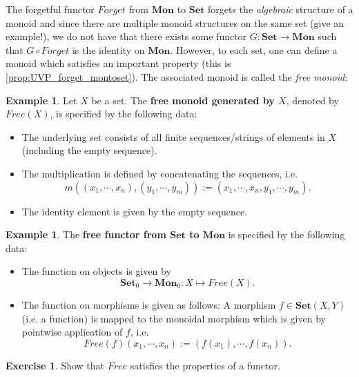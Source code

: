 \documentclass[a4paper,11pt, oneside,titlepage=false]{scrbook}
\theoremstyle{plain}
\theoremstyle{definition}
\newtheorem{exa}[thm]{Example}
\newtheorem{exer}[thm]{Exercise}
\newcommand{\Catb}[1]{\mathbf{#1}}
\newcommand{\SET}{\Catb{Set}}
\newcommand{\MON}{\Catb{Mon}}
\newcommand{\Ob}[1]{{#1}_0}
\newcommand{\CHom}[3]{{#1}(#2,#3)}
\newcommand{\co}[2]{\ensuremath{#2 \circ #1}}
\begin{document}
The forgetful functor $Forget$ from $\MON$ to $\SET$ forgets the \textit{algebraic} structure of a monoid and since there are multiple monoid structures on the same set (give an example!), we do not have that there exists some functor $G: \SET\to \MON$ such that $\co{Forget}{G}$ is the identity on $\MON$. However, to each set, one can define a monoid which satisfies an important property (this is \cref{prop:UVP_forget_montoset}). The associated monoid is called the \textit{free monoid}:
\begin{exa} Let $X$ be a set. The \textbf{free monoid generated by $X$}, denoted by $Free(X)$, is specified by the following data:
\begin{itemize}
\item The underlying set consists of all finite sequences/strings of elements in $X$ (including the empty sequence).
\item The multiplication is defined by concatenating the sequences, i.e.
\[
m\left((x_1,\cdots,x_n),(y_1,\cdots,y_m)\right) := (x_1,\cdots,x_n,y_1,\cdots,y_m).
\]
\item The identity element is given by the empty sequence.
\end{itemize}
\end{exa}

\begin{exa}\label{exa:freemonoids} The \textbf{free functor from $\SET$ to $\MON$} is specified by the following data:
\begin{itemize}
\item The function on objects is given by
\[
\Ob{\SET}\to \Ob{\MON}: X\mapsto Free(X).
\]
\item The function on morphisms is given as follows: A morphism $f \in \CHom{\SET}{X}{Y}$ (i.e. a function) is mapped to the monoidal morphism which is given by pointwise application of $f$, i.e.
\[
Free(f)(x_1,\cdots,x_n) := (f(x_1),\cdots, f(x_n)).
\]
\end{itemize}
\end{exa}

\begin{exer} Show that $Free$ satisfies the properties of a functor.
\end{exer}
\end{document}
